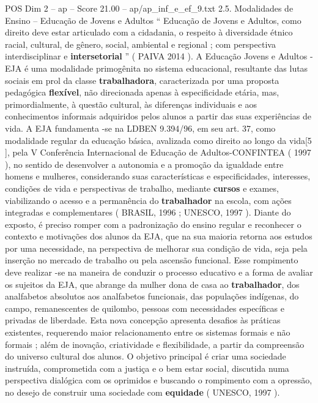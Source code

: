 \begin{textsample}{POS Dim 2 – ap – Score 21.00 – ap/ap\_inf\_e\_ef\_9.txt}  \label{ex:f2_pos_150}
2.5.
Modalidades de Ensino – Educação de Jovens e Adultos “ Educação de Jovens e Adultos, como direito deve estar articulado com a cidadania, o respeito à diversidade étnico racial, cultural, de gênero, social, ambiental e regional ; com perspectiva interdisciplinar e \textbf{intersetorial} ” ( PAIVA 2014 ).
A Educação Jovens e Adultos - EJA é uma modalidade primogênita no sistema educacional, resultante das lutas sociais em prol da classe \textbf{trabalhadora}, caracterizada por uma proposta pedagógica \textbf{flexível}, não direcionada apenas à especificidade etária, mas, primordialmente, à questão cultural, às diferenças individuais e aos conhecimentos informais adquiridos pelos alunos a partir das suas experiências de vida.
A EJA fundamenta -se na LDBEN 9.394/96, em seu art. 37, como modalidade regular da educação básica, avalizada como direito ao longo da vida[5 ], pela V Conferência Internacional de Educação de Adultos-CONFINTEA ( 1997 ), no sentido de desenvolver a autonomia e a promoção da igualdade entre homens e mulheres, considerando suas características e especificidades, interesses, condições de vida e perspectivas de trabalho, mediante \textbf{cursos} e exames, viabilizando o acesso e a permanência do \textbf{trabalhador} na escola, com ações integradas e complementares ( BRASIL, 1996 ; UNESCO, 1997 ).
Diante do exposto, é preciso romper com a padronização do ensino regular e reconhecer o contexto e motivações dos alunos da EJA, que na sua maioria retorna aos estudos por uma necessidade, na perspectiva de melhorar sua condição de vida, seja pela inserção no mercado de trabalho ou pela ascensão funcional.
Esse rompimento deve realizar -se na maneira de conduzir o processo educativo e a forma de avaliar os sujeitos da EJA, que abrange da mulher dona de casa ao \textbf{trabalhador}, dos analfabetos absolutos aos analfabetos funcionais, das populações indígenas, do campo, remanescentes de quilombo, pessoas com necessidades específicas e privadas de liberdade.
Esta nova concepção apresenta desafios às práticas existentes, requerendo maior relacionamento entre os sistemas formais e não formais ; além de inovação, criatividade e flexibilidade, a partir da compreensão do universo cultural dos alunos.
O objetivo principal é criar uma sociedade instruída, comprometida com a justiça e o bem estar social, discutida numa perspectiva dialógica com os oprimidos e buscando o rompimento com a opressão, no desejo de construir uma sociedade com \textbf{equidade} ( UNESCO, 1997 ).

\end{textsample}
